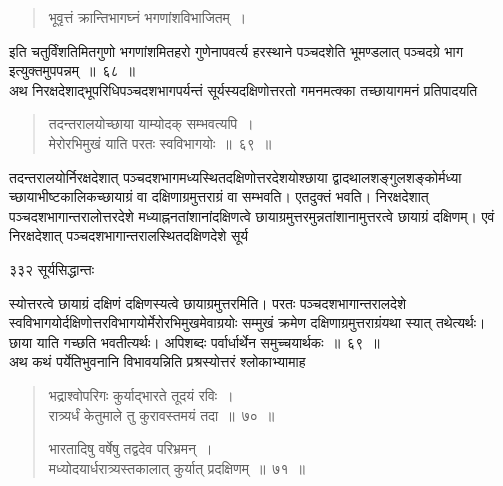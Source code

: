 \documentclass[11pt, openany]{book}
\begin{document}
 \begin{quote}
{\qt भूवृत्तं क्रान्तिभागघ्नं भगणांशविभाजितम्~। }
\end{quote}
इति चतुर्विंशतिमितगुणो भगणांशमितहरो गुणेनापवर्त्य हरस्थाने पञ्चदशेति भूमण्डलात् पञ्चदग्रे भाग इत्युक्तमुपपन्नम्~॥~६८~॥ \\
\noindent अथ निरक्षदेशाद्भूपरिधिपञ्चदशभागपर्यन्तं सूर्यस्यदक्षिणोत्तरतो गमनमत्क्का तच्छायागमनं प्रतिपादयति \textendash


 \begin{quote}
{\ssi तदन्तरालयोच्छाया याम्योदक् सम्भवत्यपि~।\\
मेरोरभिमुखं याति परतः स्वविभागयोः~॥~६९~॥}
\end{quote}
 तदन्तरालयोर्निरक्षदेशात् पञ्चदशभागमध्यस्थितदक्षिणोत्तरदेशयोश्छाया द्वादथालशङ्गुलशङ्कोर्मध्या च्छायाभीष्टकालिकच्छायाग्रं वा दक्षिणाग्रमुत्तराग्रं वा सम्भवति। एतदुक्तं भवति। निरक्षदेशात् पञ्चदशभागान्तरालोत्तरदेशे मध्याह्ननतांशानांदक्षिणत्वे छायाग्रमुत्तरमुन्नतांशानामुत्तरत्वे छायाग्रं दक्षिणम्। एवं निरक्षदेशात् पञ्चदशभागान्तरालस्थितदक्षिणदेशे सूर्य \textendash
%


\newpage


\noindent ३३२ \hspace{4cm} सूर्यसिद्धान्तः 
\vspace{1cm}


\noindent स्योत्तरत्वे छायाग्रं दक्षिणं दक्षिणस्यत्वे छायाग्रमुत्तरमिति। परतः पञ्चदशभागान्तरालदेशे स्वविभागयोर्दक्षिणोत्तरविभागयोर्मेरोरभिमुखमेवाग्रयोः सम्मुखं क्रमेण दक्षिणाग्रमुत्तराग्रंयथा स्यात् तथेत्यर्थः। छाया याति गच्छति भवतीत्यर्थः। अपिशब्दः पर्वार्धार्थेन समुच्चयार्थकः~॥~६९~॥ \\
\noindent अथ कथं पर्येतिभुवनानि विभावयन्निति प्रश्रस्योत्तरं श्लोकाभ्यामाह \textendash


 \begin{quote}
{\ssi भद्राश्वोपरिगः कुर्याद्भारते तूदयं रविः~।\\
रात्र्यर्धं केतुमाले तु कुरावस्तमयं तदा~॥~७०~॥

भारतादिषु वर्षेषु तद्वदेव परिभ्रमन्~।\\
मध्योदयार्धरात्र्यस्तकालात् कुर्यात् प्रदक्षिणम्~॥~७१~॥}
\end{quote}
\end{document}
